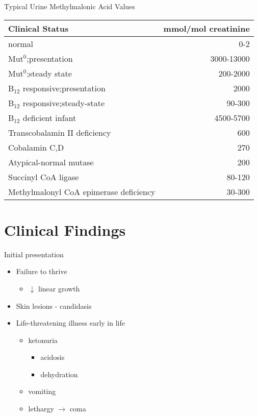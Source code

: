 \documentclass[presentation, smaller]{beamer}
\begin{document}
\begin{frame}[label={sec:orgheadline16}]{Typical Urine Methylmalonic Acid Values}
\begin{center}
\begin{tabular}{lr}
Clinical Status & mmol/mol creatinine\\
\hline
normal & 0-2\\
Mut\(^{\text{0}}\);presentation & 3000-13000\\
Mut\(^{\text{0}}\);steady state & 200-2000\\
B\(_{\text{12}}\) responsive;presentation & 2000\\
B\(_{\text{12}}\) responsive;steady-state & 90-300\\
B\(_{\text{12}}\) deficient infant & 4500-5700\\
Transcobalamin II deficiency & 600\\
Cobalamin C,D & 270\\
Atypical-normal mutase & 200\\
Succinyl CoA ligase & 80-120\\
Methylmalonyl CoA epimerase deficiency & 30-300\\
\end{tabular}
\end{center}
\end{frame}

\section{Clinical Findings}
\label{sec:orgheadline25}
\begin{frame}[label={sec:orgheadline18}]{Initial presentation}
\begin{itemize}
\item Failure to thrive
\begin{itemize}
\item \(\downarrow\) linear growth
\end{itemize}
\item Skin lesions - candidasis
\item Life-threatening illness early in life
\begin{itemize}
\item ketonuria
\begin{itemize}
\item acidosis
\item dehydration
\end{itemize}
\item vomiting
\item lethargy \(\to\) coma
\end{itemize}
\end{itemize}
\end{frame}
\end{document}
